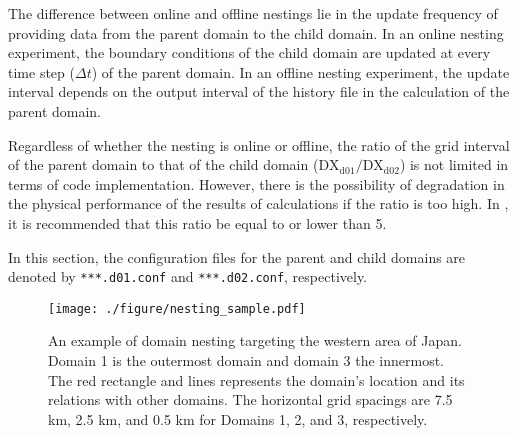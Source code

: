 The difference between online and offline nestings lie in the update frequency of providing data from the parent domain to the child domain. In an online nesting experiment, the boundary conditions of the child domain are updated at every time step ($\Delta t$) of the parent domain. In an offline nesting experiment, the update interval depends on the output interval of the history file in the calculation of the parent domain. 

Regardless of whether the nesting is online or offline, the ratio of the grid interval of the parent domain to that of the child domain  ($\mathrm{DX}_{\mathrm{d01}}/\mathrm{DX}_{\mathrm{d02}}$) is not limited in terms of code implementation. However, there is the possibility of degradation in the physical performance of the results of calculations if the ratio is too high. In \scalerm, it is recommended that this ratio be equal to or lower than 5.

In this section, the configuration files for the parent and child domains
are denoted by \verb|***.d01.conf| and \verb|***.d02.conf|, respectively.

\begin{figure}[t]
\begin{center}
  \texttt{[image: ./figure/nesting\_sample.pdf]}\\
  \caption{An example of domain nesting targeting the western area of Japan.
    Domain 1 is the outermost domain and domain 3 the innermost.
    The red rectangle and lines represents the domain’s location and its relations with other domains.
    The horizontal grid spacings are 7.5 km, 2.5 km, and 0.5 km for Domains 1, 2, and 3, respectively.
  }
  \label{fig_nestsample}
\end{center}
\end{figure}



